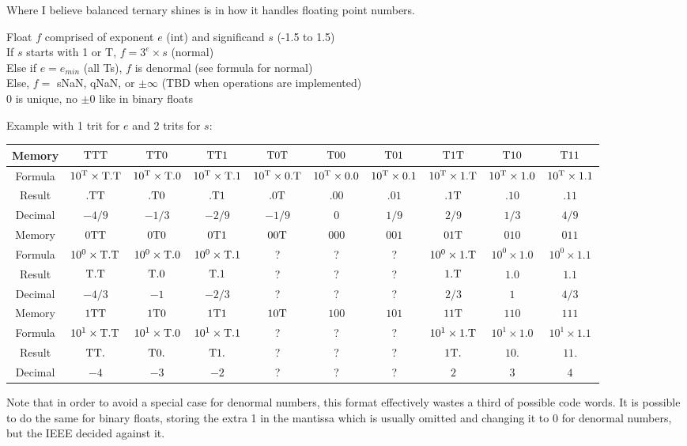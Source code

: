 \documentclass{article}
\begin{document}
Where I believe balanced ternary shines is in how it handles floating point numbers.


Float $f$ comprised of exponent $e$ (int) and significand $s$ (-1.5 to 1.5) \\
If $s$ starts with 1 or T, $f = 3^e \times s$ (normal) \\
Else if $e=e_{min}$ (all Ts), $f$ is denormal (see formula for normal) \\
Else, $f =$ sNaN, qNaN, or $\pm\infty$ (TBD when operations are implemented) \\
0 is unique, no $\pm 0$ like in binary floats
\setlength{\tabcolsep}{5pt}
\renewcommand{\arraystretch}{1.25}

\noindent
Example with 1 trit for $e$ and 2 trits for $s$: \\
\hspace{-2cm}
\begin{tabular}{*{10}{|c}|}
  \hline
  Memory
  & $\mathrm{T}\mathrm{T}\mathrm{T}$ & $\mathrm{T}\mathrm{T}0$ & $\mathrm{T}\mathrm{T}1$
  & $\mathrm{T}0\mathrm{T}$ & $\mathrm{T}00$ & $\mathrm{T}01$
  & $\mathrm{T}1\mathrm{T}$ & $\mathrm{T}10$ & $\mathrm{T}11$ \\ \hline
  Formula
  & $10^{\mathrm{T}} \times \mathrm{T}.\mathrm{T}$ & $10^{\mathrm{T}} \times \mathrm{T}.0$ & $10^{\mathrm{T}} \times \mathrm{T}.1$
  & $10^{\mathrm{T}} \times 0.\mathrm{T}$ & $10^{\mathrm{T}} \times 0.0$ & $10^{\mathrm{T}} \times 0.1$
  & $10^{\mathrm{T}} \times 1.\mathrm{T}$ & $10^{\mathrm{T}} \times 1.0$ & $10^{\mathrm{T}} \times 1.1$ \\ \hline
  Result
  & $.\mathrm{T}\mathrm{T}$ & $.\mathrm{T}0$ & $.\mathrm{T}1$
  & $.0\mathrm{T}$ & $.00$ & $.01$
  & $.1\mathrm{T}$ & $.10$ & $.11$ \\ \hline
  Decimal
  & $-4/9$ & $-1/3$ & $-2/9$
  & $-1/9$ & $0$ & $1/9$
  & $2/9$ & $1/3$ & $4/9$ \\ \hline
  \hline
  Memory
  & $0\mathrm{T}\mathrm{T}$ & $0\mathrm{T}0$ & $0\mathrm{T}1$
  & $00\mathrm{T}$ & $000$ & $001$
  & $01\mathrm{T}$ & $010$ & $011$ \\ \hline
  Formula
  & $10^0 \times \mathrm{T}.\mathrm{T}$ & $10^0 \times \mathrm{T}.0$ & $10^0 \times \mathrm{T}.1$
  & ? & ? & ?
  & $10^0 \times 1.\mathrm{T}$ & $10^0 \times 1.0$ & $10^0 \times 1.1$ \\ \hline
  Result
  & $\mathrm{T}.\mathrm{T}$ & $\mathrm{T}.0$ & $\mathrm{T}.1$
  & ? & ? & ?
  & $1.\mathrm{T}$ & $1.0$ & $1.1$ \\ \hline
  Decimal
  & $-4/3$ & $-1$ & $-2/3$
  & ? & ? & ?
  & $2/3$ & $1$ & $4/3$ \\ \hline
  \hline
  Memory
  & $1\mathrm{T}\mathrm{T}$ & $1\mathrm{T}0$ & $1\mathrm{T}1$
  & $10\mathrm{T}$ & $100$ & $101$
  & $11\mathrm{T}$ & $110$ & $111$ \\ \hline
  Formula
  & $10^1 \times \mathrm{T}.\mathrm{T}$ & $10^1 \times \mathrm{T}.0$ & $10^1 \times \mathrm{T}.1$
  & ? & ? & ?
  & $10^1 \times 1.\mathrm{T}$ & $10^1 \times 1.0$ & $10^1 \times 1.1$ \\ \hline
  Result
  & $\mathrm{T}\mathrm{T}.$ & $\mathrm{T}0.$ & $\mathrm{T}1.$
  & ? & ? & ?
  & $1\mathrm{T}.$ & $10.$ & $11.$ \\ \hline
  Decimal
  & $-4$ & $-3$ & $-2$
  & ? & ? & ?
  & $2$ & $3$ & $4$ \\ \hline
\end{tabular}

Note that in order to avoid a special case for denormal numbers,
this format effectively wastes a third of possible code words.
It is possible to do the same for binary floats,
storing the extra 1 in the mantissa which is usually omitted
and changing it to 0 for denormal numbers,
but the IEEE decided against it.
\end{document}
